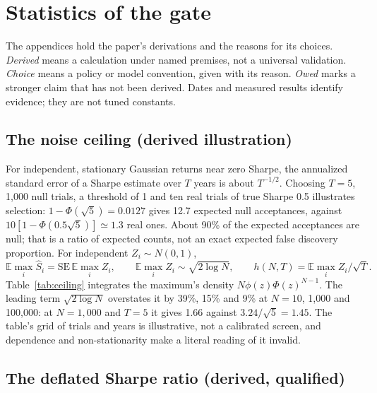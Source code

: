 \documentclass[11pt]{article}
\newcommand{\Shat}{\hat{S}}
\newcommand{\SE}{\mathrm{SE}}
\newcommand{\E}{\mathbb{E}}
\begin{document}
\appendix

\section{Statistics of the gate}\label{app:gate}

The appendices hold the paper's derivations and the reasons for its choices. \emph{Derived} means a calculation under named premises, not a universal validation. \emph{Choice} means a policy or model convention, given with its reason. \emph{Owed} marks a stronger claim that has not been derived. Dates and measured results identify evidence; they are not tuned constants.

\subsection{The noise ceiling (derived illustration)}\label{app:noise}

For independent, stationary Gaussian returns near zero Sharpe, the annualized standard error of a Sharpe estimate over $T$ years is about $T^{-1/2}$. Choosing $T=5$, 1{,}000 null trials, a threshold of 1 and ten real trials of true Sharpe 0.5 illustrates selection: $1-\Phi(\sqrt5)=0.0127$ gives 12.7 expected null acceptances, against $10[1-\Phi(0.5\sqrt5)]\simeq1.3$ real ones. About 90\% of the expected acceptances are null; that is a ratio of expected counts, not an exact expected false discovery proportion. For independent $Z_i\sim N(0,1)$,
\[
 \E\max_i\Shat_i=\SE\,\E\max_i Z_i,\qquad
 \E\max_i Z_i\sim\sqrt{2\log N},\qquad h(N,T)=\E\max_i Z_i/\sqrt T.
\]
Table~\ref{tab:ceiling} integrates the maximum's density $N\phi(z)\Phi(z)^{N-1}$. The leading term $\sqrt{2\log N}$ overstates it by 39\%, 15\% and 9\% at $N=10$, 1{,}000 and 100{,}000: at $N=1{,}000$ and $T=5$ it gives 1.66 against $3.24/\sqrt5=1.45$. The table's grid of trials and years is illustrative, not a calibrated screen, and dependence and non-stationarity make a literal reading of it invalid.

\subsection{The deflated Sharpe ratio (derived, qualified)}\label{app:dsr}
\end{document}
